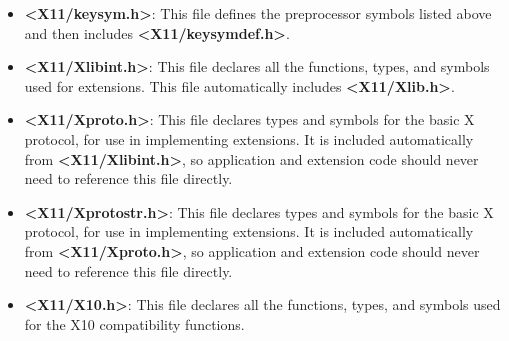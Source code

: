\documentclass{report}
\begin{document}
\begin{itemize}
\begin{itemize}
\begin{itemize}
                        \item XK\_XKB\_KEYS
                        \item XK\_3270
                        \item XK\_LATIN1
                        \item XK\_LATIN2
                        \item XK\_LATIN3
                        \item XK\_LATIN4
                        \item XK\_KATAKANA
                        \item XK\_ARABIC
                        \item XK\_CYRILLIC
                        \item XK\_GREEK
                        \item XK\_TECHNICAL
                        \item XK\_SPECIAL
                        \item XK\_PUBLISHING
                        \item XK\_APL
                        \item XK\_HEBREW
                        \item XK\_THAI 
                        \item XK\_KOREAN
                    \end{itemize}
                \item \textbf{<X11/keysym.h>}: This file defines the preprocessor symbols listed above and then includes \textbf{<X11/keysymdef.h>}.
                \item \textbf{<X11/Xlibint.h>}: This file declares all the functions, types, and symbols used for extensions. This file automatically includes \textbf{<X11/Xlib.h>}.
                \item \textbf{<X11/Xproto.h>}: This file declares types and symbols for the basic X protocol, for use in implementing extensions. It is included automatically from \textbf{<X11/Xlibint.h>}, so application and extension code should never need to reference this file directly.
                \item \textbf{<X11/Xprotostr.h>}: This file declares types and symbols for the basic X protocol, for use in implementing extensions. It is included automatically from \textbf{<X11/Xproto.h>}, so application and extension code should never need to reference this file directly.
                \item \textbf{<X11/X10.h>}: This file declares all the functions, types, and symbols used for the X10 compatibility functions.

\end{itemize}
\end{itemize}
\end{document}
